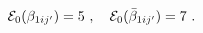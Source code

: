 \begin{equation}\label{eng5}
{\cal E}_0(\beta_{1ij'}) = 5 ~,~~~
{\cal E}_0(\bar\beta_{1ij'}) = 7 ~.
\end{equation}

